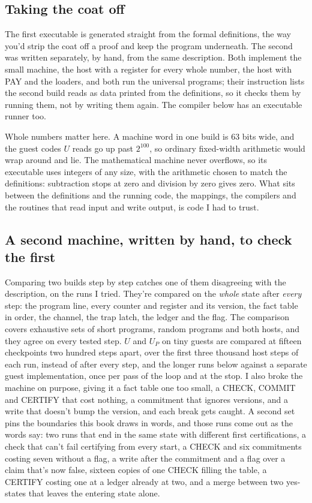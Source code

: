 \documentclass[11pt,twoside]{article}
\theoremstyle{thielethm}
\theoremstyle{thieledef}
\theoremstyle{thieledef}
\theoremstyle{thieledef}
\theoremstyle{thielethm}
\theoremstyle{thieleobs}
\theoremstyle{thielethm}
\begin{document}
\subsection{Taking the coat off}

The first executable is generated straight from the formal definitions, the way you'd
strip the coat off a proof and keep the program underneath. The second was written
separately, by hand, from the same description. Both implement the small machine, the host with a register for every whole number, the host with PAY and the loaders, and both run the universal programs; their instruction lists the second build reads as data printed from the definitions, so it checks them by running them, not by writing them again. The compiler below has an executable runner too.

Whole numbers matter here. A machine word in one build is 63 bits wide, and the guest
codes $U$ reads go up past $2^{100}$, so ordinary fixed-width arithmetic would wrap around
and lie. The mathematical machine never overflows, so its executable uses integers of any
size, with the arithmetic chosen to match the definitions: subtraction stops at zero and
division by zero gives zero. What sits between the definitions and the running code, the
mappings, the compilers and the routines that read input and write output, is code I had to
trust.

\subsection{A second machine, written by hand, to check the first}

Comparing two builds step by step catches one of them disagreeing with the description, on the
runs I tried. They're compared on the \emph{whole} state after \emph{every} step: the program line, every counter
and register and its version, the fact table in order, the channel, the trap latch, the ledger and
the flag. The comparison covers exhaustive sets of short programs, random programs and both hosts, and
they agree on every tested step. $U$ and $U_P$ on tiny guests are compared at fifteen checkpoints two hundred steps apart, over the first three thousand host steps of each run, instead of after every step, and the longer runs below against a separate guest
implementation, once per pass of the loop and at the stop. I also broke the machine on purpose, giving it a fact table one too small, a
CHECK, COMMIT and CERTIFY that cost nothing, a commitment that ignores versions, and a write that doesn't bump the version, and each break
gets caught. A second set pins the boundaries this book draws in words, and those runs come out as the words say: two runs that end in the same state with different first certifications, a check that
can't fail certifying from every start, a CHECK and six commitments costing seven without a flag, a write
after the commitment and a flag over a claim that's now false, sixteen copies of one CHECK filling
the table, a CERTIFY costing one at a ledger already at two, and a merge between two yes-states
that leaves the entering state alone.
\end{document}
